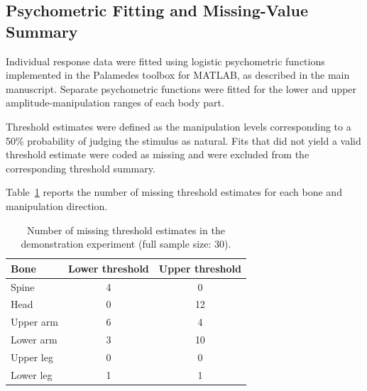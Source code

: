 \documentclass[12pt]{article}
\begin{document}
\subsection{Psychometric Fitting and Missing-Value Summary}
\label{sup:psychometric-fitting}

Individual response data were fitted using logistic psychometric
functions implemented in the Palamedes toolbox for MATLAB, as described
in the main manuscript. Separate psychometric functions were fitted for
the lower and upper amplitude-manipulation ranges of each body part.

Threshold estimates were defined as the manipulation levels
corresponding to a 50\% probability of judging the stimulus as natural.
Fits that did not yield a valid threshold estimate were coded as missing
and were excluded from the corresponding threshold summary.

Table~\ref{tab:sup-missing-values} reports the number of missing
threshold estimates for each bone and manipulation direction.

\begin{table}[H]
\centering

\caption{
Number of missing threshold estimates in the demonstration experiment (full sample size: 30).
}
\label{tab:sup-missing-values}

\begin{tabular}{lcc}
\toprule
Bone &
Lower threshold &
Upper threshold \\
\midrule
Spine     & 4 & 0 \\
Head      & 0 & 12 \\
Upper arm & 6 & 4 \\
Lower arm & 3 & 10 \\
Upper leg & 0 & 0 \\
Lower leg & 1 & 1 \\
\bottomrule
\end{tabular}

\end{table}



\end{document}
